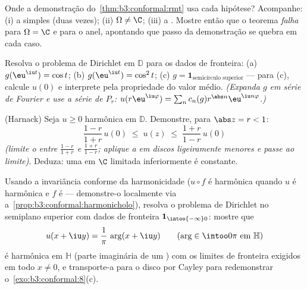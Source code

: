 \begin{exercise}[$\star\star\star$]\label{exo:b3:conformal:7}
Onde a demonstração do~\cref{thm:b3:conformal:rmt} usa cada hipótese? Acompanhe: (i)
a  simples (duas vezes); (ii) $\Omega \neq \C$; (iii) a .
Mostre então que o teorema \emph{falha} para $\Omega = \C$ e para o anel,
apontando que passo da demonstração se quebra em cada caso.
\end{exercise}

\begin{exercise}[$\star\star$]\label{exo:b3:conformal:8}
Resolva o problema de Dirichlet em $\mathbb D$ para os dados de fronteira:
(a) $g(\eu^{\iu t}) = \cos t$; (b) $g(\eu^{\iu t}) =
\cos^2 t$; (c) $g = \mathbf 1_{\text{semicírculo superior}}$ --- para (c), calcule $u(0)$ e
interprete pela propriedade do valor médio. \emph{(Expanda $g$ em
série de Fourier e use a série de $P_r$: $u(r\eu^{\iu\varphi}) = \sum_n c_n(g)
r^{\abs n}\eu^{\iu n\varphi}$.)}
\end{exercise}

\begin{exercise}[$\star\star\star$]\label{exo:b3:conformal:9}
(Harnack) Seja $u \geq 0$ harmônica em $\mathbb D$. Demonstre, para $\abs z = r < 1$:
\[
\frac{1 - r}{1 + r}\,u(0) \;\leq\; u(z) \;\leq\;
\frac{1 + r}{1 - r}\,u(0)
\]
\emph{(limite o  entre $\frac{1-r}{1+r}$ e $\frac{1+r}{1-r}$; aplique a
 em discos ligeiramente menores e passe ao limite)}.
Deduza: uma  em $\C$ limitada inferiormente é
constante.
\end{exercise}

\begin{exercise}[$\star\star$]\label{exo:b3:conformal:10}
Usando a invariância conforme da harmonicidade ($u\circ f$ é harmônica quando
$u$ é harmônica e $f$ é  --- demonstre-o localmente via
a~\cref{prop:b3:conformal:harmonicholo}), resolva o problema de Dirichlet no semiplano
superior com dados de fronteira $\mathbf 1_{\intoo{-\infty}0}$: mostre que
\[
u(x + \iu y) = \frac1\pi\,\arg(x + \iu y)
\qquad (\arg \in \intoo0\pi \text{ em } \mathbb H)
\]
é harmônica em $\mathbb H$ (parte imaginária de um ) com
os limites de fronteira exigidos em todo $x \neq
0$, e transporte-a para o
disco por Cayley para redemonstrar o~\cref{exo:b3:conformal:8}(c).
\end{exercise}

